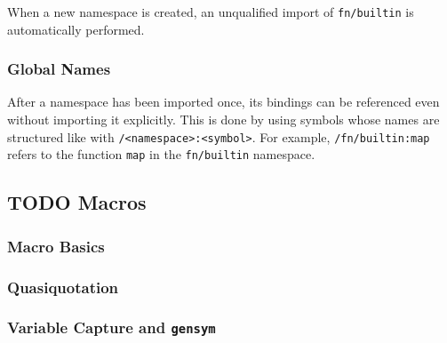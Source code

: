\documentclass[11pt]{article}
\begin{document}
When a new namespace is created, an unqualified import of \texttt{fn/builtin} is
automatically performed.


\subsubsection{Global Names}
\label{sec:orgb090073}

After a namespace has been imported once, its bindings can be referenced even
without importing it explicitly. This is done by using symbols whose names are
structured like with \texttt{/<namespace>:<symbol>}. For example, \texttt{/fn/builtin:map}
refers to the function \texttt{map} in the \texttt{fn/builtin} namespace.


\subsection{{\bfseries\sffamily TODO} Macros}
\label{sec:orgbcf79c6}

\subsubsection{Macro Basics}
\label{sec:org20cc8cc}

\subsubsection{Quasiquotation}
\label{sec:orgf5b9097}

\subsubsection{Variable Capture and \texttt{gensym}}
\label{sec:org76c455d}
\end{document}
